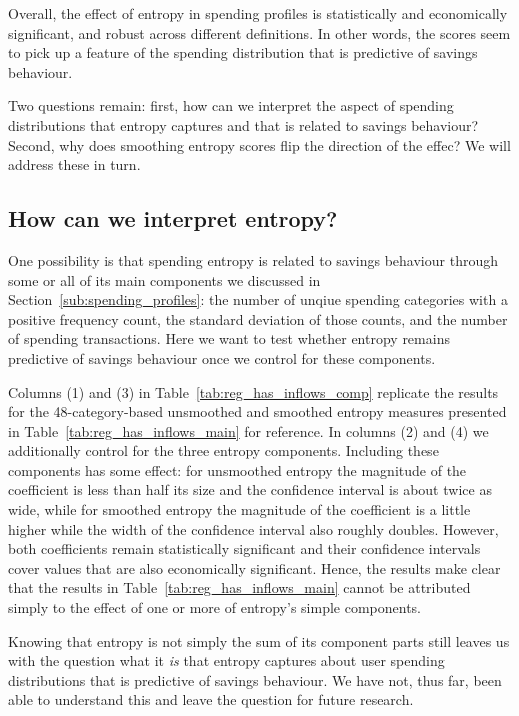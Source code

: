 Overall, the effect of entropy in spending profiles is statistically and
economically significant, and robust across different definitions. In other
words, the scores seem to pick up a feature of the spending distribution that
is predictive of savings behaviour.

Two questions remain: first, how can we interpret the aspect of spending
distributions that entropy captures and that is related to savings behaviour?
Second, why does smoothing entropy scores flip the direction of the effec? We
will address these in turn.


\subsection{How can we interpret entropy?}%
\label{sub:is_entropy_more_than_the_sum_of_its_parts_}

One possibility is that spending entropy is related to savings behaviour
through some or all of its main components we discussed in
Section~\ref{sub:spending_profiles}: the number of unqiue spending categories
with a positive frequency count, the standard deviation of those counts, and
the number of spending transactions. Here we want to test whether entropy
remains predictive of savings behaviour once we control for these components.



Columns (1) and (3) in Table~\ref{tab:reg_has_inflows_comp} replicate the
results for the 48-category-based unsmoothed and smoothed entropy measures
presented in Table~\ref{tab:reg_has_inflows_main} for reference. In columns (2)
and (4) we additionally control for the three entropy components. Including
these components has some effect: for unsmoothed entropy the magnitude of the
coefficient is less than half its size and the confidence interval is about
twice as wide, while for smoothed entropy the magnitude of the coefficient is a
little higher while the width of the confidence interval also roughly doubles.
However, both coefficients remain statistically significant and their
confidence intervals cover values that are also economically significant.
Hence, the results make clear that the results in
Table~\ref{tab:reg_has_inflows_main} cannot be attributed simply to the effect
of one or more of entropy's simple components.

Knowing that entropy is not simply the sum of its component parts still leaves
us with the question what it \textit{is} that entropy captures about user
spending distributions that is predictive of savings behaviour. We have not,
thus far, been able to understand this and leave the question for future
research.


